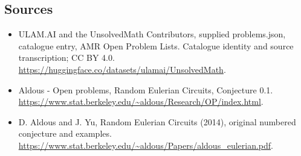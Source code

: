 \documentclass[11pt,a4paper]{article}
\begin{document}
\subsection{Sources}
\begin{itemize}
\item[S1] ULAM.AI and the UnsolvedMath Contributors, supplied problems.json, catalogue entry, AMR Open Problem Lists. Catalogue identity and source transcription; CC BY 4.0.
\url{https://huggingface.co/datasets/ulamai/UnsolvedMath}.
\item[S2] Aldous - Open problems, Random Eulerian Circuits, Conjecture 0.1. 
\url{https://www.stat.berkeley.edu/~aldous/Research/OP/index.html}.
\item[S3] D. Aldous and J. Yu, Random Eulerian Circuits (2014), original numbered conjecture and examples.
\url{https://www.stat.berkeley.edu/~aldous/Papers/aldous_eulerian.pdf}.
\end{itemize}
\end{document}
